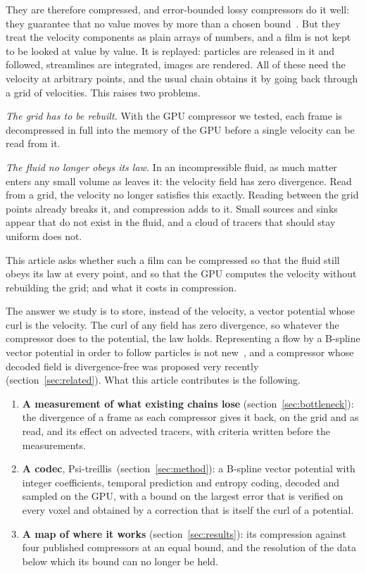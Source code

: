 \documentclass[11pt,a4paper]{article}
\newcommand{\codec}{Psi-treillis}
\begin{document}
They are therefore compressed, and error-bounded lossy compressors do it well: they guarantee that no value moves by
more than a chosen bound~\cite{liang2023sz3,li2023lossy,di2025survey}. But they treat the velocity components as
plain arrays of numbers, and a film is not kept to be looked at value by value. It is replayed: particles are released
in it and followed, streamlines are integrated, images are rendered. All of these need the velocity at arbitrary
points, and the usual chain obtains it by going back through a grid of velocities. This raises two problems.

\emph{The grid has to be rebuilt.} With the GPU compressor we tested, each frame is decompressed in full into the
memory of the GPU before a single velocity can be read from it.

\emph{The fluid no longer obeys its law.} In an incompressible fluid, as much matter enters any small volume as leaves
it: the velocity field has zero divergence. Read from a grid, the velocity no longer satisfies this exactly. Reading
between the grid points already breaks it, and compression adds to it. Small sources and sinks appear that do not
exist in the fluid, and a cloud of tracers that should stay uniform does not.

This article asks whether such a film can be compressed so that the fluid still obeys its law at every point, and so
that the GPU computes the velocity without rebuilding the grid; and what it costs in compression.

The answer we study is to store, instead of the velocity, a vector potential whose curl is the velocity. The curl of
any field has zero divergence, so whatever the compressor does to the potential, the law holds. Representing a flow by
a B-spline vector potential in order to follow particles is not new~\cite{ravu2016creating}, and a
compressor whose decoded field is divergence-free was proposed very recently~\cite{pluzhnik2026property}
(section~\ref{sec:related}). What this article contributes is the following.
\begin{enumerate}
  \item \textbf{A measurement of what existing chains lose} (section~\ref{sec:bottleneck}): the divergence of a frame as
  each compressor gives it back, on the grid and as read, and its effect on advected tracers, with criteria written
  before the measurements.
  \item \textbf{A codec}, \codec\ (section~\ref{sec:method}): a B-spline vector potential with integer coefficients,
  temporal prediction and entropy coding, decoded and sampled on the GPU, with a bound on the largest error that is
  verified on every voxel and obtained by a correction that is itself the curl of a potential.
  \item \textbf{A map of where it works} (section~\ref{sec:results}): its compression against four published
  compressors at an equal bound, and the resolution of the data below which its bound can no longer be held.
\end{enumerate}
\end{document}

